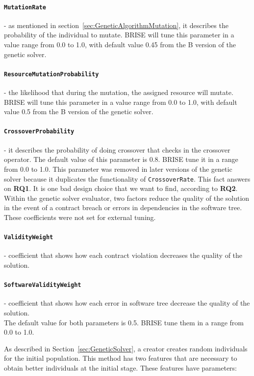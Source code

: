 \paragraph{\texttt{MutationRate}} - as mentioned in section~\ref{sec:GeneticAlgorithmMutation}, it describes the probability of the individual to mutate. BRISE will tune this parameter in a value range from 0.0 to 1.0, with default value 0.45 from the B version of the genetic solver.
\paragraph{\texttt{ResourceMutationProbability}} - the likelihood that during the mutation, the assigned resource will mutate. BRISE will tune this parameter in a value range from 0.0 to 1.0, with default value 0.5 from the B version of the genetic solver.
\paragraph{\texttt{CrossoverProbability}} - it describes the probability of doing crossover that checks in the crossover operator. The default value of this parameter is 0.8. BRISE tune it in a range from 0.0 to 1.0. This parameter was removed in later versions of the genetic solver because it duplicates the functionality of \texttt{CrossoverRate}. This fact answers on \textbf{RQ1}. It is one bad design choice that we want to find, according to \textbf{RQ2}.\\ 


Within the genetic solver evaluator, two factors reduce the quality of the solution in the event of a contract breach or errors in dependencies in the software tree. These coefficients were not set for external tuning.
\paragraph{\texttt{ValidityWeight}} - coefficient that shows how each contract violation decreases  the quality of the solution.
\paragraph{\texttt{SoftwareValidityWeight}} - coefficient that shows how each error in software tree decrease the quality of the solution.\\

The default value for both parameters is 0.5. BRISE tune them in a range from 0.0 to 1.0.

As described in Section~\ref{sec:GeneticSolver}, a creator creates random individuals for the initial population.
This method has two features that are necessary to obtain better individuals at the initial stage. These features have parameters:

